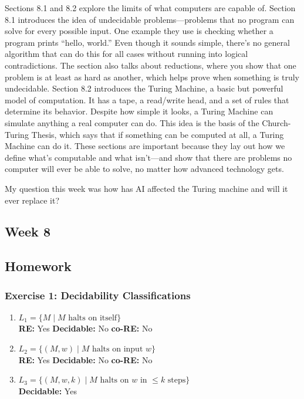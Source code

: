 \documentclass{article}
\theoremstyle{theorem}
\theoremstyle{definition}
\theoremstyle{remark}
\begin{document}
Sections 8.1 and 8.2 explore the limits of what computers are capable of. Section 8.1 introduces the idea of undecidable problems—problems that no program can solve 
for every possible input. One example they use is checking whether a program prints “hello, world.” Even though it sounds simple, there’s no general algorithm that 
can do this for all cases without running into logical contradictions. The section also talks about reductions, where you show that one problem is at least as hard as 
another, which helps prove when something is truly undecidable. Section 8.2 introduces the Turing Machine, a basic but powerful model of computation. It has a tape, a 
read/write head, and a set of rules that determine its behavior. Despite how simple it looks, a Turing Machine can simulate anything a real computer can do. This idea 
is the basis of the Church-Turing Thesis, which says that if something can be computed at all, a Turing Machine can do it. These sections are important because they lay 
out how we define what’s computable and what isn’t—and show that there are problems no computer will ever be able to solve, no matter how advanced technology gets.

My question this week was how has AI affected the Turing machine and will it ever replace it?

\subsection{Week 8}

\smallskip

\subsection*{Homework}
\subsubsection*{Exercise 1: Decidability Classifications}

\begin{enumerate}
    \item $L_1 = \{ M \mid M \text{ halts on itself} \}$ \\
    \textbf{RE:} Yes \quad \textbf{Decidable:} No \quad \textbf{co-RE:} No

    \item $L_2 = \{(M, w) \mid M \text{ halts on input } w \}$ \\
    \textbf{RE:} Yes \quad \textbf{Decidable:} No \quad \textbf{co-RE:} No

    \item $L_3 = \{(M, w, k) \mid M \text{ halts on } w \text{ in } \leq k \text{ steps} \}$ \\
    \textbf{Decidable:} Yes
\end{enumerate}
\end{document}
